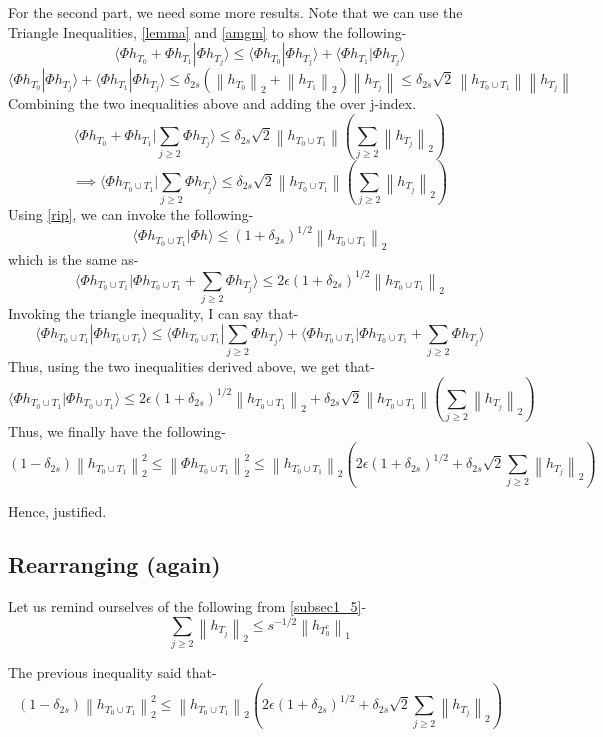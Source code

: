 \documentclass[a4paper,11pt]{article}
\numberwithin{definition}{section}
\numberwithin{mytheorem}{subsection}
\newcommand\norm[1]{\left\lVert#1\right\rVert}
\begin{document}
For the second part, we need some more results. Note that we can use the Triangle Inequalities, \ref{lemma} and \ref{amgm} to show the following-
$$\langle \Phi h_{T_0} + \Phi h_{T_1}| \Phi h_{T_j}\rangle \leq \langle \Phi h_{T_0}| \Phi h_{T_j}\rangle + \langle \Phi h_{T_1}| \Phi h_{T_j}\rangle$$
$$\langle \Phi h_{T_0}| \Phi h_{T_j}\rangle + \langle \Phi h_{T_1}| \Phi h_{T_j}\rangle \leq \delta_{2s} (\norm{h_{T_0}}_2 + \norm{h_{T_1}}_2) \norm{h_{T_{j}}} \leq  \delta_{2s} \sqrt{2}\,\norm{h_{T_0 \cup T_1}} \norm{h_{T_{j}}}$$
Combining the two inequalities above and adding the over j-index.
$$\langle \Phi h_{T_0} + \Phi h_{T_1}| \sum_{j \geq 2} \Phi h_{T_j}\rangle \leq \delta_{2s} \sqrt{2} \norm{h_{T_0 \cup T_1}}(\sum \limits_{j \geq 2} \norm{h_{T_j}}_2)$$
$$\implies \langle \Phi h_{T_0 \cup T_1}| \sum_{j \geq 2} \Phi h_{T_j}\rangle \leq \delta_{2s} \sqrt{2} \norm{h_{T_0 \cup T_1}}(\sum \limits_{j \geq 2} \norm{h_{T_j}}_2)$$
Using \ref{rip}, we can invoke the following-
$$\langle \Phi h_{T_0 \cup T_1}| \Phi h\rangle \leq (1 + \delta_{2s})^{1/2} \norm{ h_{T_0 \cup T_1}}_2 $$
which is the same as-
$$\langle \Phi h_{T_0 \cup T_1}|  \Phi h_{T_0 \cup T_1} + \sum_{j \geq 2} \Phi h_{T_j} \rangle \leq 2\epsilon(1 + \delta_{2s})^{1/2} \norm{ h_{T_0 \cup T_1}}_2 $$
Invoking the triangle inequality, I can say that-
$$\langle \Phi h_{T_0 \cup T_1}| \Phi h_{T_0 \cup T_1} \rangle \leq \langle \Phi h_{T_0 \cup T_1}| \sum_{j \geq 2} \Phi h_{T_j}\rangle + \langle \Phi h_{T_0 \cup T_1}|  \Phi h_{T_0 \cup T_1} + \sum_{j \geq 2} \Phi h_{T_j} \rangle$$
Thus, using the two inequalities derived above, we get that-
$$\langle \Phi h_{T_0 \cup T_1}| \Phi h_{T_0 \cup T_1} \rangle \leq  2\epsilon(1 + \delta_{2s})^{1/2} \norm{ h_{T_0 \cup T_1}}_2 + \delta_{2s} \sqrt{2} \norm{h_{T_0 \cup T_1}}(\sum \limits_{j \geq 2} \norm{h_{T_j}}_2)$$
Thus, we finally have the following-
$$(1 - \delta_{2s}) \norm{h_{T_0 \cup T_1}}_2^2 \leq \norm{\Phi h_{T_0 \cup T_1}}_2^2 \leq \norm{ h_{T_0 \cup T_1}}_2 (2\epsilon (1 + \delta_{2s})^{1/2} + \delta_{2s}\sqrt{2}\sum \limits_{j \geq 2} \norm{h_{T_j}}_2) $$

Hence, justified.

\subsection{Rearranging (again)}
\label{rearr2}
Let us remind ourselves of the following from \ref{subsec1_5}-
$$\sum_{j \geq 2} \norm{h_{T_j}}_2 \leq s^{-1/2} \norm{h_{T_0^c}}_1$$

The previous inequality said that-
$$(1 - \delta_{2s}) \norm{h_{T_0 \cup T_1}}_2^2 \leq \norm{ h_{T_0 \cup T_1}}_2 (2\epsilon (1 + \delta_{2s})^{1/2} + \delta_{2s}\sqrt{2}\sum \limits_{j \geq 2} \norm{h_{T_j}}_2) $$
\end{document}

